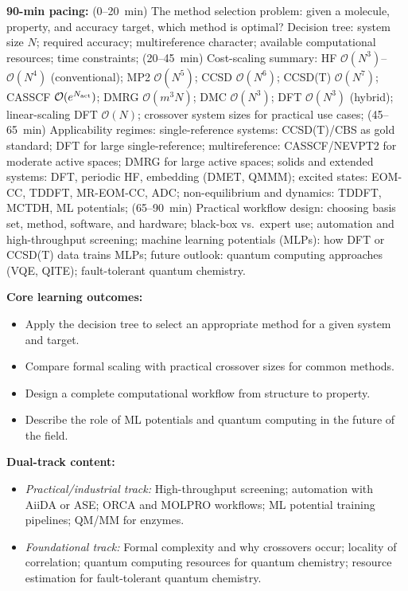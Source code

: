 \documentclass[11pt,a4paper]{article}
\begin{document}
\begin{tcolorbox}[modulebox, title={Module~II.1 / L12: Method Selection in Practice}]
\textbf{90-min pacing:} (0--20~min) The method selection problem: given a molecule, property,
and accuracy target, which method is optimal?
Decision tree: system size $N$; required accuracy; multireference character;
available computational resources; time constraints;
(20--45~min) Cost-scaling summary: HF $\mathcal{O}(N^3)$--$\mathcal{O}(N^4)$ (conventional);
MP2 $\mathcal{O}(N^5)$; CCSD $\mathcal{O}(N^6)$; CCSD(T) $\mathcal{O}(N^7)$;
CASSCF $\mathcal{O}(e^{N_{\rm act}})$; DMRG $\mathcal{O}(m^3 N)$; DMC $\mathcal{O}(N^3)$;
DFT $\mathcal{O}(N^3)$ (hybrid); linear-scaling DFT $\mathcal{O}(N)$;
crossover system sizes for practical use cases;
(45--65~min) Applicability regimes:
single-reference systems: CCSD(T)/CBS as gold standard; DFT for large single-reference;
multireference: CASSCF/NEVPT2 for moderate active spaces; DMRG for large active spaces;
solids and extended systems: DFT, periodic HF, embedding (DMET, QMMM);
excited states: EOM-CC, TDDFT, MR-EOM-CC, ADC;
non-equilibrium and dynamics: TDDFT, MCTDH, ML potentials;
(65--90~min) Practical workflow design: choosing basis set, method, software, and hardware;
black-box vs.\ expert use; automation and high-throughput screening;
machine learning potentials (MLPs): how DFT or CCSD(T) data trains MLPs;
future outlook: quantum computing approaches (VQE, QITE); fault-tolerant quantum chemistry.

\medskip\textbf{Core learning outcomes:}
\begin{itemize}[leftmargin=1.4em,topsep=2pt,itemsep=1pt]
  \item Apply the decision tree to select an appropriate method for a given system and target.
  \item Compare formal scaling with practical crossover sizes for common methods.
  \item Design a complete computational workflow from structure to property.
  \item Describe the role of ML potentials and quantum computing in the future of the field.
\end{itemize}

\medskip\textbf{Dual-track content:}
\begin{itemize}[leftmargin=1.4em,topsep=2pt,itemsep=1pt]
  \item \textit{Practical/industrial track:} High-throughput screening; automation with AiiDA
    or ASE; ORCA and MOLPRO workflows; ML potential training pipelines; QM/MM for enzymes.
  \item \textit{Foundational track:} Formal complexity and why crossovers occur;
    locality of correlation; quantum computing resources for quantum chemistry;
    resource estimation for fault-tolerant quantum chemistry.
\end{itemize}


\end{tcolorbox}
\end{document}
